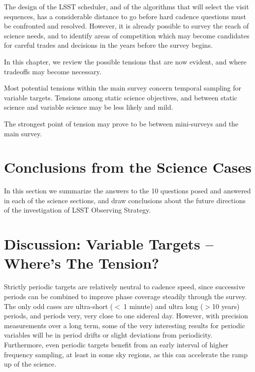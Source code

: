 The design of the LSST scheduler, and of the algorithms that will select
the visit sequences, has a considerable distance to go before hard
cadence questions must be confronted and resolved.  However, it is
already possible to survey the reach of science needs, and to identify
areas of competition which may become candidates for careful trades and
decisions in the years before the survey begins.

In this chapter, we review the possible tensions that are now evident,
and where tradeoffs may become necessary.

Most potential tensions within the main survey concern temporal sampling
for variable targets.  Tensions among static science objectives, and
between static science and variable science may be less likely and mild.

The strongest point of tension may prove to be between mini-surveys and
the main survey.


\section{Conclusions from the Science Cases}

In this section we summarize the answers to the 10 questions posed and 
answered in each of the science sections, and draw conclusions about 
the future directions of the  investigation of LSST Observing Strategy.







\section{Discussion: Variable Targets -- Where's The Tension?}

Strictly periodic targets are relatively neutral to cadence speed, since
successive periods can be combined to improve phase coverage steadily
through the survey.  The only odd cases are ultra-short ($<~ $1 minute)
and ultra long ($> $10 years) periods, and periods very, very close to
one sidereal day.  However, with precision measurements over a long
term, some of the very interesting results for periodic variables will
be in period drifts or slight deviations from periodicity. Furthermore,
even periodic targets benefit from an early interval of higher frequency
sampling, at least in some sky regions, as this can accelerate the ramp
up of the science.

